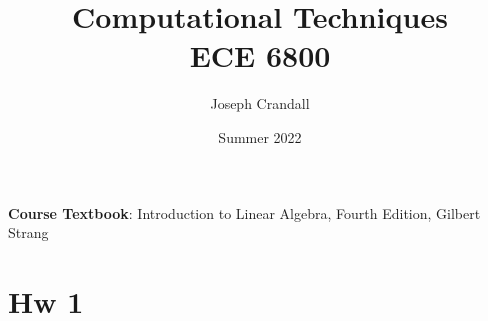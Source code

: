 
\usepackage{algorithm, algpseudocode, bm, color, gensymb, listings, siunitx, soul, subfiles, verbatim}
\usepackage[a4paper, total={7.5in, 10in}]{geometry}

\title{Computational Techniques\\
\large ECE 6800}
\author{Joseph Crandall}
\date{Summer 2022}


\maketitle

\textbf{Course Textbook}: Introduction to Linear Algebra, Fourth Edition, Gilbert Strang

\begin{comment}

\section{Lecture 1 Vectors and Matrices}


\end{comment}

\section{Hw 1}


